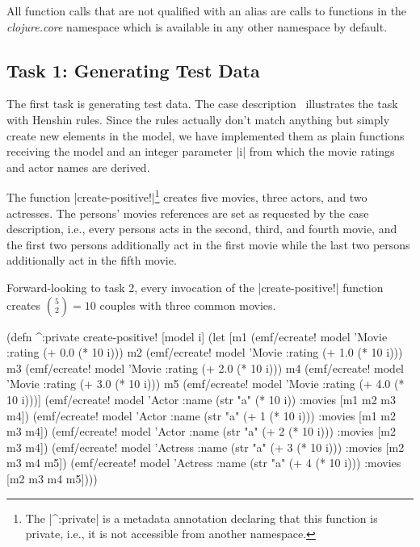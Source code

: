 \documentclass[a4paper]{article}
\newcommand{\code}{\clojureinline}
\begin{document}
All function calls that are not qualified with an alias are calls to functions
in the \emph{clojure.core} namespace which is available in any other namespace
by default.

\subsection{Task 1: Generating Test Data}
\label{sec:task-1:generating-test-data}

The first task is generating test data.  The case
description~\cite{movies-case-desc} illustrates the task with Henshin rules.
Since the rules actually don't match anything but simply create new elements in
the model, we have implemented them as plain functions receiving the model and
an integer parameter \code|i| from which the movie ratings and actor names are
derived.

The function \code|create-positive!|\footnote{The \code|^:private| is a
  metadata annotation declaring that this function is private, i.e., it is not
  accessible from another namespace.} creates five movies, three actors, and
two actresses.  The persons' \textsf{movies} references are set as requested by
the case description, i.e., every persons acts in the second, third, and fourth
movie, and the first two persons additionally act in the first movie while the
last two persons additionally act in the fifth movie.

Forward-looking to task 2, every invocation of the \code|create-positive!|
function creates \({5 \choose 2} = 10\) couples with three common movies.

\begin{clojurecode}
(defn ^:private create-positive! [model i]
  (let [m1 (emf/ecreate! model 'Movie :rating (+ 0.0 (* 10 i)))
        m2 (emf/ecreate! model 'Movie :rating (+ 1.0 (* 10 i)))
        m3 (emf/ecreate! model 'Movie :rating (+ 2.0 (* 10 i)))
        m4 (emf/ecreate! model 'Movie :rating (+ 3.0 (* 10 i)))
        m5 (emf/ecreate! model 'Movie :rating (+ 4.0 (* 10 i)))]
    (emf/ecreate! model 'Actor   :name (str "a" (* 10 i))       :movies [m1 m2 m3 m4])
    (emf/ecreate! model 'Actor   :name (str "a" (+ 1 (* 10 i))) :movies [m1 m2 m3 m4])
    (emf/ecreate! model 'Actor   :name (str "a" (+ 2 (* 10 i))) :movies [m2 m3 m4])
    (emf/ecreate! model 'Actress :name (str "a" (+ 3 (* 10 i))) :movies [m2 m3 m4 m5])
    (emf/ecreate! model 'Actress :name (str "a" (+ 4 (* 10 i))) :movies [m2 m3 m4 m5])))
\end{clojurecode}
\end{document}
